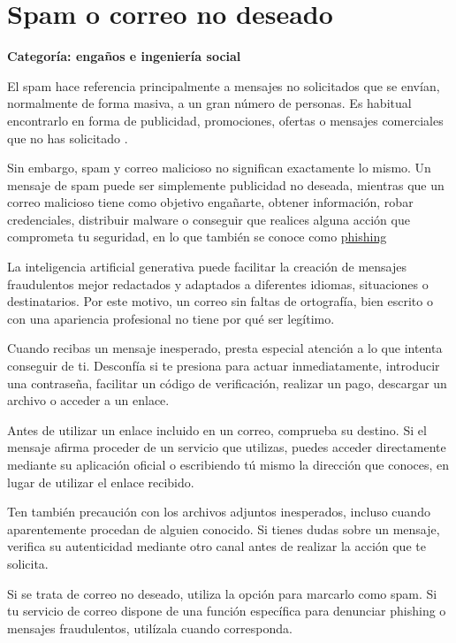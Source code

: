\documentclass[
  spanish,
  a4paper,
  openany]{book}
\begin{document}
\section{Spam o correo no deseado}\label{spam-o-correo-no-deseado}

\textbf{Categoría: engaños e ingeniería social}

El spam hace referencia principalmente a mensajes no solicitados que se envían, normalmente de forma masiva, a un gran número de personas. Es habitual encontrarlo en forma de publicidad, promociones, ofertas o mensajes comerciales que no has solicitado \citep{WIKI-spam}.

Sin embargo, spam y correo malicioso no significan exactamente lo mismo. Un mensaje de spam puede ser simplemente publicidad no deseada, mientras que un correo malicioso tiene como objetivo engañarte, obtener información, robar credenciales, distribuir malware o conseguir que realices alguna acción que comprometa tu seguridad, en lo que también se conoce como \hyperref[phishing]{phishing}

La inteligencia artificial generativa puede facilitar la creación de mensajes fraudulentos mejor redactados y adaptados a diferentes idiomas, situaciones o destinatarios. Por este motivo, un correo sin faltas de ortografía, bien escrito o con una apariencia profesional no tiene por qué ser legítimo.

Cuando recibas un mensaje inesperado, presta especial atención a lo que intenta conseguir de ti. Desconfía si te presiona para actuar inmediatamente, introducir una contraseña, facilitar un código de verificación, realizar un pago, descargar un archivo o acceder a un enlace.

Antes de utilizar un enlace incluido en un correo, comprueba su destino. Si el mensaje afirma proceder de un servicio que utilizas, puedes acceder directamente mediante su aplicación oficial o escribiendo tú mismo la dirección que conoces, en lugar de utilizar el enlace recibido.

Ten también precaución con los archivos adjuntos inesperados, incluso cuando aparentemente procedan de alguien conocido. Si tienes dudas sobre un mensaje, verifica su autenticidad mediante otro canal antes de realizar la acción que te solicita.

Si se trata de correo no deseado, utiliza la opción para marcarlo como spam. Si tu servicio de correo dispone de una función específica para denunciar phishing o mensajes fraudulentos, utilízala cuando corresponda.
\end{document}
